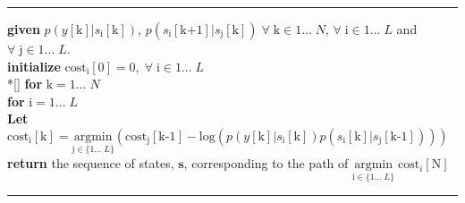     \noindent\rule[10pt]{\textwidth}{0.4pt}
    {\footnotesize
    \begin{tabbing}
        {\textbf{given}} $p(y[\text{k}]|s_{\text{i}}[\text{k}])$, $p(s_{\text{i}}[\text{k+1}]|s_{\text{j}}[\text{k}]) \; \forall  \; \text{k} \in {1...\;N}$, $ \forall \; \text{i} \in {1...\;L}$ and $ \forall \; \text{j} \in {1...\;L}$.\\
        {\textbf{initialize}} $\text{cost}_{\text{i}}[0]=0, \; \forall \; \text{i} \in {1...\;L}$
         \\*[\smallskipamount]
        {\textbf{for}  $\text{k} = 1... \; N $} \\
         \qquad \= {\textbf{for} $\text{i} = 1... \; L$}\\
        \qquad \qquad \= \textbf{Let} $\text{cost}_{\text{i}}[\text{k}] = \underset{\text{j} \in \{1... \; L\}} {\text{argmin}}\left( \text{cost}_{\text{j}}[\text{k-1}]
        -\text{log}(p(y[\text{k}]|s_{\text{i}}[\text{k}])p(s_{\text{i}}[\text{k}]|s_{\text{j}}[\text{k-1}]))
        \right)$ \\
        {\textbf{ return}} the sequence of states, $\mathbf{s}$, corresponding to the path of $\underset{\text{i} \in \{1... \; L\}} {\text{argmin}} \; \text{cost}_{i}[\text{N}] $
    \end{tabbing}}
    \noindent\rule[10pt]{\textwidth}{0.4pt}






